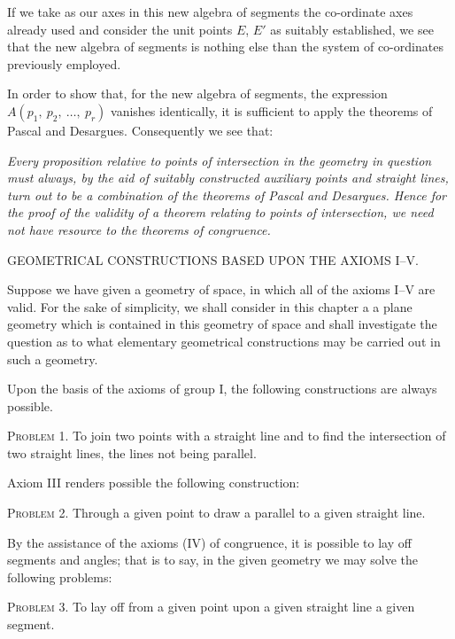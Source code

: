 \documentclass[11pt,oneside]{book}
\begin{document}
If we take as our axes in this new algebra of segments
the co-ordinate axes already used and consider
the unit points $E$, $E'$ as suitably established, we see
that the new algebra of segments is nothing else than
the system of co-ordinates previously employed.

In order to show that, for the new algebra of segments,
the expression $A(p_1,\ p_2,\ \ldots,\ p_r)$ vanishes
identically, it is sufficient to apply the theorems of
Pascal and Desargues. Consequently we see that:

\textit{Every proposition relative to points of intersection in
the geometry in question must always, by the aid of suitably
constructed auxiliary points and straight lines, turn
out to be a combination of the theorems of Pascal and
Desargues. Hence for the proof of the validity of a theorem
relating to points of intersection, we need not have
resource to the theorems of congruence.}
\newpage
\begin{center}{\Large GEOMETRICAL CONSTRUCTIONS BASED UPON THE AXIOMS I--V.}\end{center}
\label{p36}

Suppose we have given a geometry of space, in
which all of the axioms I--V are valid. For the
sake of simplicity, we shall consider in this chapter a
a plane geometry which is contained in this geometry
of space and shall investigate the question as to what
elementary geometrical constructions may be carried
out in such a geometry.

Upon the basis of the axioms of group I, the following
constructions are always possible.

{\scshape Problem} 1. To join two points with a straight
line and to find the intersection of two straight lines,
the lines not being parallel.

Axiom III renders possible the following construction:

{\scshape Problem} 2. Through a given point to draw a parallel
to a given straight line.

By the assistance of the axioms (IV) of congruence,
it is possible to lay off segments and angles;
that is to say, in the given geometry we may solve the
following problems:

{\scshape Problem} 3. To lay off from a given point upon a
given straight line a given segment.
\end{document}
